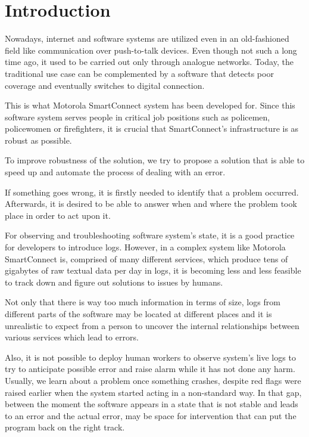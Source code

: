 
\chapter{Introduction}
\label{introduction}

Nowadays, internet and software systems are utilized even in an old-fashioned field like communication over push-to-talk devices. Even though not such a long time ago, it used to be carried out only through analogue networks. Today, the traditional use case can be complemented by a software that detects poor coverage and eventually switches to digital connection. 

This is what Motorola SmartConnect system has been developed for. 
Since this software system serves people in critical job positions such as policemen, policewomen or firefighters, it is crucial that SmartConnect's infrastructure is as robust as possible.

To improve robustness of the solution, we try to propose a solution that is able to speed up and automate the process of dealing with an error.

If something goes wrong, it is firstly needed to identify that a problem occurred. 
Afterwards, it is desired to be able to answer when and where the problem took place in order to act upon it.

For observing and troubleshooting software system's state, it is a good practice for developers to introduce logs.
However, in a complex system like Motorola SmartConnect is, comprised of many different services, which produce tens of gigabytes of raw textual data per day in logs, it is becoming less and less feasible to track down and figure out solutions to issues by humans.

Not only that there is way too much information in terms of size, logs from different parts of the software may be located at different places and it is unrealistic to expect from a person to uncover the internal relationships between various services which lead to errors.

Also, it is not possible to deploy human workers to observe system's live logs to try to anticipate possible error and raise alarm while it has not done any harm. 
Usually, we learn about a problem once something crashes, despite red flags were raised earlier when the system started acting in a non-standard way. In that gap, between the moment the software appears in a state that is not stable and leads to an error and the actual error, may be space for intervention that can put the program back on the right track.

